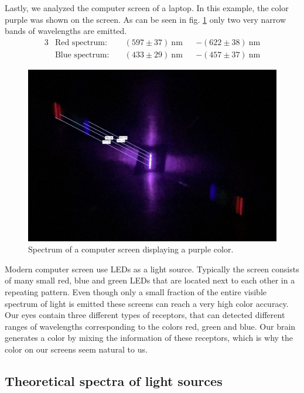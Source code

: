 Lastly, we analyzed the computer screen of a laptop. In this example, the color purple was shown on the screen.
As can be seen in fig. \ref{fig_purple_screen} only two very narrow bands of wavelengths are emitted.
\begin{alignat}{3}
    &\text{Red spectrum:} \; &&(597 \pm 37)~\si{\nano\meter} & &- (622 \pm 38)~\si{\nano\meter} \nonumber\\
    &\text{Blue spectrum:} \; &&(433 \pm 29)~\si{\nano\meter} & &- (457 \pm 37)~\si{\nano\meter} \nonumber
\end{alignat}
\begin{figure}[H]
    \centering
    \includegraphics[scale = 0.24]{src/images/purple_screen_meas.png}
    \caption{Spectrum of a computer screen displaying a purple color.}
    \label{fig_purple_screen}
\end{figure}

Modern computer screen use LEDs as a light source. Typically the screen consists of many small red, blue and 
green LEDs that are located next to each other in a repeating pattern. Even though only a small fraction of 
the entire visible spectrum of light is emitted these screens can reach a very high color accuracy. Our eyes 
contain three different types of receptors, that can detected different ranges of wavelengths corresponding 
to the colors red, green and blue. Our brain generates a color by mixing the information of these receptors, 
which is why the color on our screens seem natural to us.

\newpage
\subsection{Theoretical spectra of light sources}

